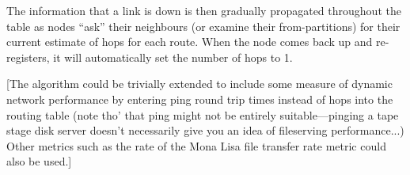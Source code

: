 \documentclass{cmspaper}
\begin{document}
The information that a link is down is then gradually propagated
throughout the table as nodes ``ask'' their neighbours (or examine
their from-partitions) for their current estimate of hops for each
route.  When the node comes back up and re-registers, it will
automatically set the number of hops to 1.

[The algorithm could be trivially extended to include some measure of
dynamic network performance by entering ping round trip times instead
of hops into the routing table (note tho' that ping might not be
entirely suitable---pinging a tape stage disk server doesn't
necessarily give you an idea of fileserving performance...) Other
metrics such as the rate of the Mona Lisa file transfer rate metric
could also be used.]
\end{document}
